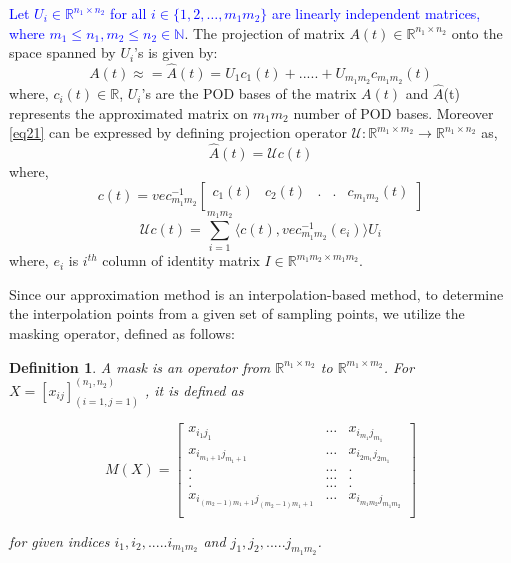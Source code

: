 \documentclass{article}
\newtheorem{definition}{Definition}
\begin{document}
\textcolor{blue}{Let $U_i \in \mathbb{R}^{n_1 \times n_2}$ for all $i \in \{1,2, \dots, m_1m_2\}$ are linearly independent matrices, where $m_1 \leq n_1,m_2 \leq n_2 \in \mathbb{N}$}. The projection of matrix $A(t) \in \mathbb{R}^{n_1 \times n_2}$ onto the space spanned by $U_i$'s is given by:
\begin{equation}  \label{eq21}
A(t) \approx = \hat{A}(t) = U_1c_1(t)+.....+U_{m_1m_2}c_{m_1m_2}(t)
\end{equation}
where, $c_i(t) \in \mathbb{R}$, {$U_i$}'s are the POD bases of the matrix $A(t)$ and $\hat{A}$(t) represents the approximated matrix on $m_1m_2$ number of POD bases. Moreover \eqref{eq21} can be expressed by defining projection operator $\mathcal{U}:\mathbb{R}^{m_1\times m_2}\rightarrow\mathbb{R}^{n_1\times n_2}$ as,
\begin{equation}  \label{eq22}
\hat{A}(t) = \mathcal{U}c(t)
\end{equation}
where,
\begin{equation}  \label{eq23}
c(t)=vec_{m_1m_2}^{-1} \begin{bmatrix}
c_1(t) & c_2(t) &.&.& c_{m_1m_2}(t)\\
\end{bmatrix}
\end{equation}
\begin{equation}  \label{eq24}
\mathcal{U}c(t)=\sum_{i=1}^{m_1m_2} \langle c(t),vec_{m_1m_2}^{-1}(e_i)\rangle U_i
\end{equation}
where, $e_i$ is $i^{th}$ column of identity matrix $I \in \mathbb{R}^{m_1m_2 \times m_1m_2}$.

Since our approximation method is an interpolation-based method, to determine the interpolation points from a given set of sampling points, we utilize the masking operator, defined as follows:
\begin{definition}
 A mask is an operator from $ \mathbb{R}^{n_1\times n_2}$ to $\mathbb{R}^{m_1\times m_2}$. For $X=[x_{ij}]_{(i=1,j=1)}^{(n_1,n_2)}$ , it is defined as

\begin{equation}\label{eq10}
M(X)=
\begin{bmatrix}
x_{i_1j_1} & \dots & x_{i_{m_1}j_{m_1}} \\
x_{i_{m_1+1}j_{m_1+1}}  &\dots & x_{i_{2m_1}j_{2m_1}} \\
.& \dots&.\\
.& \dots&.\\
.& \dots&.\\
x_{i_{(m_2-1)m_1+1}j_{(m_2-1)m_1+1}} & \dots & x_{i_{m_1m_2}j_{m_1m_2}}\\
\end{bmatrix}
\end{equation}

for given indices $i_1,i_2,.....i_{m_1m_2}$ and $j_1,j_2,.....j_{m_1m_2}$.

\end{definition}
\end{document}
